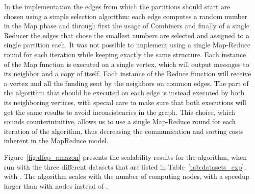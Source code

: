 In the \dfep implementation the  edges from which the partitions should start are 
chosen using a simple selection algorithm: each edge computes a random number in 
the Map phase and through first the usage of Combiners and finally of a single 
Reducer the  edges that chose the smallest  numbers are selected and assigned to 
a single partition each. 
It was not possible to implement \dfep using a single Map-Reduce round for 
each iteration while keeping exactly the same structure. Each instance of the Map 
function is executed on a single vertex, which will output messages to its 
neighbor and a copy of itself. Each instance of the Reduce function will receive 
a vertex and all the funding sent by the neighbors on common edges. The part of 
the algorithm that should be executed on each edge is instead executed by both its 
neighboring vertices, with special care to make sure that both executions will get 
the same results to avoid inconsistencies in the graph. This choice, which sounds 
counterintuitive, allows us to use a single Map-Reduce round for each iteration of the algorithm, 
thus decreasing the communication and sorting costs inherent in the MapReduce model.

Figure~\ref{fig:dfep_amazon} presents the scalability results for the \dfep
algorithm, when run with the three different datasets that are listed in
Table~\ref{tab:datasets_exp}, with . The algorithm scales with the number
of computing nodes, with a speedup larger than  with  nodes instead of .

